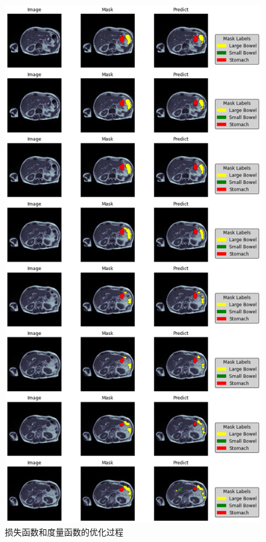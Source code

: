 \documentclass[letterpaper, 10pt, conference, twoside]{ieeeconf}
\begin{document}
\begin{figure}[htbp]
  \centering
  \includegraphics[width = 1\linewidth]{predict_visual.png}
  \caption{损失函数和度量函数的优化过程}
  \label{fig:fig9}
\end{figure}
\end{document}
